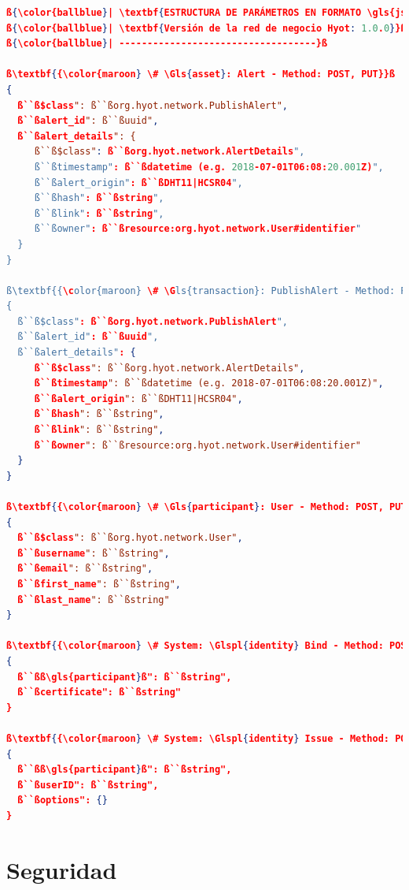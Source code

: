 \documentclass[12pt,a4paper, twoside]{report}
\begin{document}
\begin{lstlisting}[language=json, basicstyle=\ttfamily\footnotesize, numbers=none, escapechar=ß]
ß{\color{ballblue}| \textbf{ESTRUCTURA DE PARÁMETROS EN FORMATO \gls{json-a}}}ß
ß{\color{ballblue}| \textbf{Versión de la red de negocio Hyot: 1.0.0}}ß
ß{\color{ballblue}| -----------------------------------}ß

ß\textbf{{\color{maroon} \# \Gls{asset}: Alert - Method: POST, PUT}}ß
{
  ß``ß$class": ß``ßorg.hyot.network.PublishAlert",
  ß``ßalert_id": ß``ßuuid",
  ß``ßalert_details": {
     ß``ß$class": ß``ßorg.hyot.network.AlertDetails",
     ß``ßtimestamp": ß``ßdatetime (e.g. 2018-07-01T06:08:20.001Z)",
     ß``ßalert_origin": ß``ßDHT11|HCSR04",
     ß``ßhash": ß``ßstring",
     ß``ßlink": ß``ßstring",
     ß``ßowner": ß``ßresource:org.hyot.network.User#identifier"
  }
}

ß\textbf{{\color{maroon} \# \Gls{transaction}: PublishAlert - Method: POST}}ß
{
  ß``ß$class": ß``ßorg.hyot.network.PublishAlert",
  ß``ßalert_id": ß``ßuuid",
  ß``ßalert_details": {
     ß``ß$class": ß``ßorg.hyot.network.AlertDetails",
     ß``ßtimestamp": ß``ßdatetime (e.g. 2018-07-01T06:08:20.001Z)",
     ß``ßalert_origin": ß``ßDHT11|HCSR04",
     ß``ßhash": ß``ßstring",
     ß``ßlink": ß``ßstring",
     ß``ßowner": ß``ßresource:org.hyot.network.User#identifier"
  }
}
            
ß\textbf{{\color{maroon} \# \Gls{participant}: User - Method: POST, PUT}}ß
{
  ß``ß$class": ß``ßorg.hyot.network.User",
  ß``ßusername": ß``ßstring",
  ß``ßemail": ß``ßstring",
  ß``ßfirst_name": ß``ßstring",
  ß``ßlast_name": ß``ßstring"
}

ß\textbf{{\color{maroon} \# System: \Glspl{identity} Bind - Method: POST}}ß
{
  ß``ßß\gls{participant}ß": ß``ßstring",
  ß``ßcertificate": ß``ßstring"
}

ß\textbf{{\color{maroon} \# System: \Glspl{identity} Issue - Method: POST}}ß
{
  ß``ßß\gls{participant}ß": ß``ßstring",
  ß``ßuserID": ß``ßstring",
  ß``ßoptions": {}
}

\end{lstlisting}

	\section{Seguridad}
	
\end{document}
